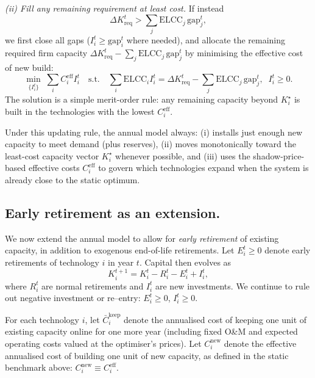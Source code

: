 \documentclass[preprint,authoryear,12pt]{elsarticle}
\begin{document}
\emph{(ii) Fill any remaining requirement at least cost.}
If instead
\begin{equation}
\Delta K_{\mathrm{req}}^t > \sum_j \mathrm{ELCC}_j\,\mathrm{gap}_j^t,
\end{equation}
we first close all gaps ($I_i^t \ge \mathrm{gap}_i^t$ where needed), and
allocate the remaining required firm capacity
$\Delta K_{\mathrm{req}}^t - \sum_j \mathrm{ELCC}_j\,\mathrm{gap}_j^t$
by minimising the effective cost of new build:
\begin{equation}
\min_{\{I_i^t\}} \;\sum_i C_i^{\mathrm{eff}} I_i^t
\quad \text{s.t.} \quad
\sum_i \mathrm{ELCC}_i I_i^t
=
\Delta K_{\mathrm{req}}^t - \sum_j \mathrm{ELCC}_j\,\mathrm{gap}_j^t,
\;\; I_i^t \ge 0.
\end{equation}
The solution is a simple merit-order rule: any remaining capacity beyond
$K_i^{\star}$ is built in the technologies with the lowest $C_i^{\mathrm{eff}}$.

Under this updating rule, the annual model always:
(i) installs just enough new capacity to meet demand (plus reserves),
(ii) moves monotonically toward the least-cost capacity vector
$K_i^{\star}$ whenever possible, and
(iii) uses the shadow-price-based effective costs $C_i^{\mathrm{eff}}$
to govern which technologies expand when the system is already close to
the static optimum.

\subsection{Early retirement as an extension.}

We now extend the annual model to allow for \emph{early retirement} of
existing capacity, in addition to exogenous end-of-life retirements.
Let $E_i^t \ge 0$ denote early retirements of technology $i$ in year $t$.
Capital then evolves as
\begin{equation}
K_i^{t+1} = K_i^t - R_i^t - E_i^t + I_i^t,
\end{equation}
where $R_i^t$ are normal retirements and $I_i^t$ are new investments.
We continue to rule out negative investment or re–entry:
$E_i^t \ge 0$, $I_i^t \ge 0$.

For each technology $i$, let $\bar{C}_i^{\mathrm{keep}}$ denote the
annualised cost of keeping one unit of existing capacity online for one
more year (including fixed O\&M and expected operating costs valued at
the optimiser’s prices). Let $C_i^{\mathrm{new}}$ denote the
effective annualised cost of building one unit of new capacity,
as defined in the static benchmark above:
$C_i^{\mathrm{new}} \equiv C_i^{\mathrm{eff}}$.
\end{document}

